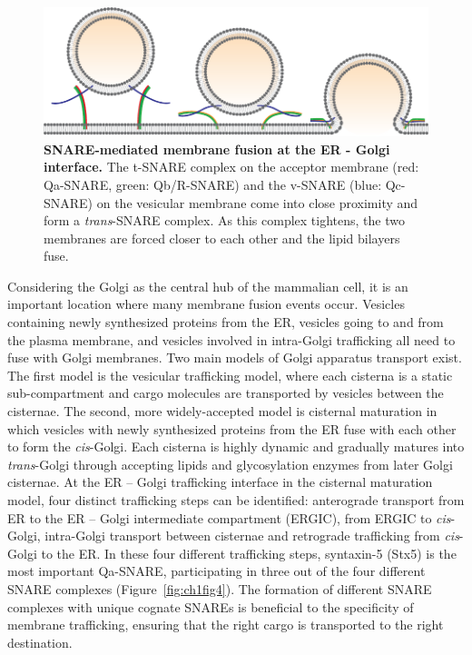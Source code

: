 \begin{figure}
    \includegraphics[keepaspectratio=true,width=\textwidth,height=\textheight]{chapters/chapter1/chapter1_Figure3.pdf}
    \caption{\textbf{SNARE-mediated membrane fusion at the ER - Golgi interface.} The t-SNARE complex on the acceptor membrane (red: Qa-SNARE, green: Qb/R-SNARE) and the v-SNARE (blue: Qc-SNARE) on the vesicular membrane come into close proximity and form a \emph{trans}-SNARE complex. As this complex tightens, the two membranes are forced closer to each other and the lipid bilayers fuse.}
    \label{fig:ch1fig3}
\end{figure}

Considering the Golgi as the central hub of the mammalian cell, it is an important location where many membrane fusion events occur. Vesicles containing newly synthesized proteins from the ER, vesicles going to and from the plasma membrane, and vesicles involved in intra-Golgi trafficking all need to fuse with Golgi membranes. Two main models of Golgi apparatus transport exist. The first model is the vesicular trafficking model, where each cisterna is a static sub-compartment and cargo molecules are transported by vesicles between the cisternae\cite{cottam_retrograde_2012}. The second, more widely-accepted model is cisternal maturation in which vesicles with newly synthesized proteins from the ER fuse with each other to form the \emph{cis}-Golgi. Each cisterna is highly dynamic and gradually matures into \emph{trans}-Golgi through accepting lipids and glycosylation enzymes from later Golgi cisternae\cite{cottam_retrograde_2012}. At the ER – Golgi trafficking interface in the cisternal maturation model, four distinct trafficking steps can be identified: anterograde transport from ER to the ER – Golgi intermediate compartment (ERGIC), from ERGIC to \emph{cis}-Golgi, intra-Golgi transport between cisternae and retrograde trafficking from \emph{cis}-Golgi to the ER. In these four different trafficking steps, syntaxin-5 (Stx5) is the most important Qa-SNARE, participating in three out of the four different SNARE complexes\cite{linders_stx5-mediated_2019} (Figure~\ref{fig:ch1fig4}). The formation of different SNARE complexes with unique cognate SNAREs is beneficial to the specificity of membrane trafficking, ensuring that the right cargo is transported to the right destination.

